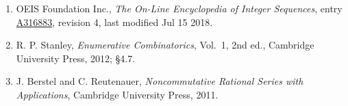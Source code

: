 \documentclass[11pt]{article}
\theoremstyle{definition}
\begin{document}
\begin{enumerate}

\item OEIS Foundation Inc., \emph{The On-Line Encyclopedia of Integer Sequences}, entry \href{https://oeis.org/A316883}{A316883}, revision 4, last modified Jul 15 2018.

\item R. P. Stanley, \emph{Enumerative Combinatorics}, Vol.~1, 2nd ed., Cambridge University Press, 2012; \S4.7.

\item J. Berstel and C. Reutenauer, \emph{Noncommutative Rational Series with Applications}, Cambridge University Press, 2011.

\end{enumerate}
\end{document}
